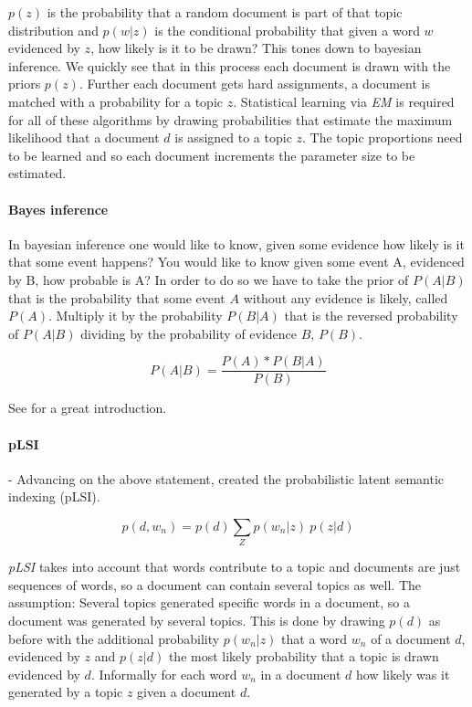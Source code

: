     $p(z)$ is the probability that a random document is part of that topic distribution and $p(w|z)$ is the conditional probability that given a word $w$ evidenced by $z$, how likely is it to be drawn? This tones down to bayesian inference. We quickly see that in this process each document is drawn with the priors $p(z)$. Further each document gets hard assignments, a document is matched with a probability for a topic $z$. Statistical learning via \emph{EM} is required for all of these algorithms by drawing probabilities that estimate the maximum likelihood that a document $d$ is assigned to a topic $z$. The topic proportions need to be learned and so each document increments the parameter size to be estimated.

    \paragraph{Bayes inference}

      In bayesian inference one would like to know, given some evidence how likely is it that some event happens? You would like to know given some event A, evidenced by B, how probable is A? In order to do so we have to take the prior of $P(A|B)$ that is the probability that some event $A$ without any evidence is likely, called $P(A)$. Multiply it by the probability $P(B|A)$ that is the reversed probability of $P(A|B)$ dividing by the probability of evidence $B$, $P(B)$.

      \begin{equation}
        P(A|B) = \frac{P(A) * P(B|A)}{P(B)}
      \end{equation}

      See \cite{Nothing} for a great introduction.
    
    \paragraph{pLSI} - Advancing on the above statement, \cite{PLSA2001} created the probabilistic latent semantic indexing (pLSI).

      \begin{equation}
        p(d, w_n) = p(d)\sum_{Z} p(w_n|z)\:p(z|d)
      \end{equation} 

    \emph{pLSI} takes into account that words contribute to a topic and documents are just sequences of words, so a document can contain several topics as well. The assumption: Several topics generated specific words in a document, so a document was generated by several topics. This is done by drawing $p(d)$ as before with the additional probability $p(w_n|z)$ that a word $w_n$ of a document $d$, evidenced by $z$ and $p(z|d)$ the most likely probability that a topic is drawn evidenced by $d$. Informally for each word $w_n$ in a document $d$ how likely was it generated by a topic $z$ given a document $d$.

